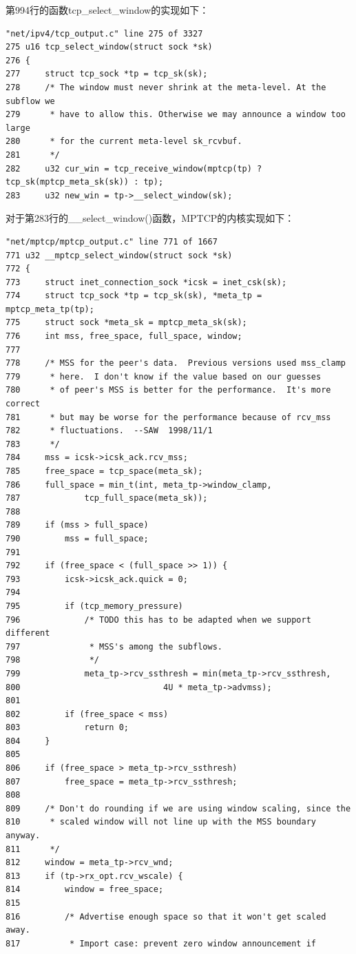 第994行的函数tcp\_select\_window的实现如下：
\small\begin{verbatim}
"net/ipv4/tcp_output.c" line 275 of 3327
275 u16 tcp_select_window(struct sock *sk)
276 {
277     struct tcp_sock *tp = tcp_sk(sk);
278     /* The window must never shrink at the meta-level. At the subflow we
279      * have to allow this. Otherwise we may announce a window too large
280      * for the current meta-level sk_rcvbuf.
281      */
282     u32 cur_win = tcp_receive_window(mptcp(tp) ? tcp_sk(mptcp_meta_sk(sk)) : tp);
283     u32 new_win = tp->__select_window(sk);
\end{verbatim}\normalsize
对于第283行的\_\_select\_window()函数，MPTCP的内核实现如下：
\small\begin{verbatim}
"net/mptcp/mptcp_output.c" line 771 of 1667
771 u32 __mptcp_select_window(struct sock *sk)
772 {
773     struct inet_connection_sock *icsk = inet_csk(sk);
774     struct tcp_sock *tp = tcp_sk(sk), *meta_tp = mptcp_meta_tp(tp);
775     struct sock *meta_sk = mptcp_meta_sk(sk);
776     int mss, free_space, full_space, window;
777
778     /* MSS for the peer's data.  Previous versions used mss_clamp
779      * here.  I don't know if the value based on our guesses
780      * of peer's MSS is better for the performance.  It's more correct
781      * but may be worse for the performance because of rcv_mss
782      * fluctuations.  --SAW  1998/11/1
783      */
784     mss = icsk->icsk_ack.rcv_mss;
785     free_space = tcp_space(meta_sk);
786     full_space = min_t(int, meta_tp->window_clamp,
787             tcp_full_space(meta_sk));
788
789     if (mss > full_space)
790         mss = full_space;
791
792     if (free_space < (full_space >> 1)) {
793         icsk->icsk_ack.quick = 0;
794
795         if (tcp_memory_pressure)
796             /* TODO this has to be adapted when we support different
797              * MSS's among the subflows.
798              */
799             meta_tp->rcv_ssthresh = min(meta_tp->rcv_ssthresh,
800                             4U * meta_tp->advmss);
801
802         if (free_space < mss)
803             return 0;
804     }
805
806     if (free_space > meta_tp->rcv_ssthresh)
807         free_space = meta_tp->rcv_ssthresh;
808
809     /* Don't do rounding if we are using window scaling, since the
810      * scaled window will not line up with the MSS boundary anyway.
811      */
812     window = meta_tp->rcv_wnd;
813     if (tp->rx_opt.rcv_wscale) {
814         window = free_space;
815
816         /* Advertise enough space so that it won't get scaled away.
817          * Import case: prevent zero window announcement if

\end{verbatim}
